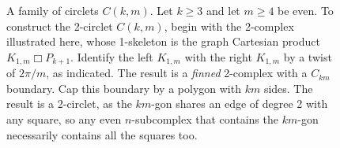 \documentclass{article}
\begin{document}
\begin{figure}[h]
    \centering
    \caption{A family of circlets $C(k,m)$. Let $k \geq 3$ and let $m \geq 4$ be even. To construct the 2-circlet $C(k,m)$, begin with the 2-complex illustrated here, whose 1-skeleton is the graph Cartesian product $K_{1,m}\Box P_{k+1}$. Identify the left $K_{1,m}$ with the right $K_{1,m}$ by a twist of $2\pi/m$, as indicated. The result is a {\it finned} 2-complex with a $C_{km}$ boundary. Cap this boundary by a polygon with $km$ sides. The result is a 2-circlet, as the $km$-gon shares an edge of degree 2 with any square, so any even $n$-subcomplex that contains the $km$-gon necessarily contains all the squares too.}
    \label{fig:CircletConstruction}
\end{figure}
\end{document}
